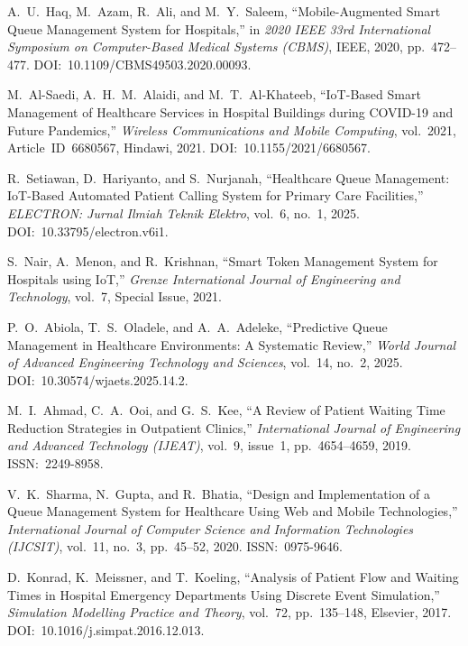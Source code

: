 \documentclass[12pt,a4paper]{article}
\begin{document}
\begin{enumerate}[label={[\arabic*]}]
\item A.~U.~Haq, M.~Azam, R.~Ali, and M.~Y.~Saleem, ``Mobile-Augmented Smart Queue Management System for Hospitals,'' in \textit{2020 IEEE 33rd International Symposium on Computer-Based Medical Systems (CBMS)}, IEEE, 2020, pp.~472--477. DOI:~10.1109/CBMS49503.2020.00093.

\item M.~Al-Saedi, A.~H.~M.~Alaidi, and M.~T.~Al-Khateeb, ``IoT-Based Smart Management of Healthcare Services in Hospital Buildings during COVID-19 and Future Pandemics,'' \textit{Wireless Communications and Mobile Computing}, vol.~2021, Article~ID~6680567, Hindawi, 2021. DOI:~10.1155/2021/6680567.

\item R.~Setiawan, D.~Hariyanto, and S.~Nurjanah, ``Healthcare Queue Management: IoT-Based Automated Patient Calling System for Primary Care Facilities,'' \textit{ELECTRON: Jurnal Ilmiah Teknik Elektro}, vol.~6, no.~1, 2025. DOI:~10.33795/electron.v6i1.

\item S.~Nair, A.~Menon, and R.~Krishnan, ``Smart Token Management System for Hospitals using IoT,'' \textit{Grenze International Journal of Engineering and Technology}, vol.~7, Special Issue, 2021.

\item P.~O.~Abiola, T.~S.~Oladele, and A.~A.~Adeleke, ``Predictive Queue Management in Healthcare Environments: A Systematic Review,'' \textit{World Journal of Advanced Engineering Technology and Sciences}, vol.~14, no.~2, 2025. DOI:~10.30574/wjaets.2025.14.2.

\item M.~I.~Ahmad, C.~A.~Ooi, and G.~S.~Kee, ``A Review of Patient Waiting Time Reduction Strategies in Outpatient Clinics,'' \textit{International Journal of Engineering and Advanced Technology (IJEAT)}, vol.~9, issue~1, pp.~4654--4659, 2019. ISSN:~2249-8958.

\item V.~K.~Sharma, N.~Gupta, and R.~Bhatia, ``Design and Implementation of a Queue Management System for Healthcare Using Web and Mobile Technologies,'' \textit{International Journal of Computer Science and Information Technologies (IJCSIT)}, vol.~11, no.~3, pp.~45--52, 2020. ISSN:~0975-9646.

\item D.~Konrad, K.~Meissner, and T.~Koeling, ``Analysis of Patient Flow and Waiting Times in Hospital Emergency Departments Using Discrete Event Simulation,'' \textit{Simulation Modelling Practice and Theory}, vol.~72, pp.~135--148, Elsevier, 2017. DOI:~10.1016/j.simpat.2016.12.013.


\end{enumerate}
\end{document}
